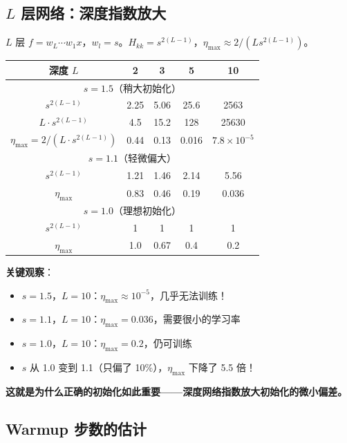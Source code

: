 \documentclass[12pt, a4paper]{ctexart}
\begin{document}
\subsection{$L$ 层网络：深度指数放大}

$L$ 层 $f = w_L\cdots w_1 x$，$w_l = s$。$H_{kk} = s^{2(L-1)}$，$\eta_{\max} \approx 2/(Ls^{2(L-1)})$。

\begin{center}
\begin{tabular}{c|cccc}
深度 $L$ & 2 & 3 & 5 & 10 \\
\hline
\multicolumn{5}{c}{$s = 1.5$（稍大初始化）} \\
\hline
$s^{2(L-1)}$ & 2.25 & 5.06 & 25.6 & 2563 \\
$L \cdot s^{2(L-1)}$ & 4.5 & 15.2 & 128 & 25630 \\
$\eta_{\max} = 2/(L\cdot s^{2(L-1)})$ & 0.44 & 0.13 & 0.016 & $7.8 \times 10^{-5}$ \\
\hline
\multicolumn{5}{c}{$s = 1.1$（轻微偏大）} \\
\hline
$s^{2(L-1)}$ & 1.21 & 1.46 & 2.14 & 5.56 \\
$\eta_{\max}$ & 0.83 & 0.46 & 0.19 & 0.036 \\
\hline
\multicolumn{5}{c}{$s = 1.0$（理想初始化）} \\
\hline
$s^{2(L-1)}$ & 1 & 1 & 1 & 1 \\
$\eta_{\max}$ & 1.0 & 0.67 & 0.4 & 0.2 \\
\end{tabular}
\end{center}

\textbf{关键观察}：
\begin{itemize}
    \item $s = 1.5$，$L = 10$：$\eta_{\max} \approx 10^{-5}$，几乎无法训练！
    \item $s = 1.1$，$L = 10$：$\eta_{\max} = 0.036$，需要很小的学习率
    \item $s = 1.0$，$L = 10$：$\eta_{\max} = 0.2$，仍可训练
    \item $s$ 从 1.0 变到 1.1（只偏了 10\%），$\eta_{\max}$ 下降了 5.5 倍！
\end{itemize}

\textbf{这就是为什么正确的初始化如此重要——深度网络指数放大初始化的微小偏差。}

\subsection{Warmup 步数的估计}
\end{document}
